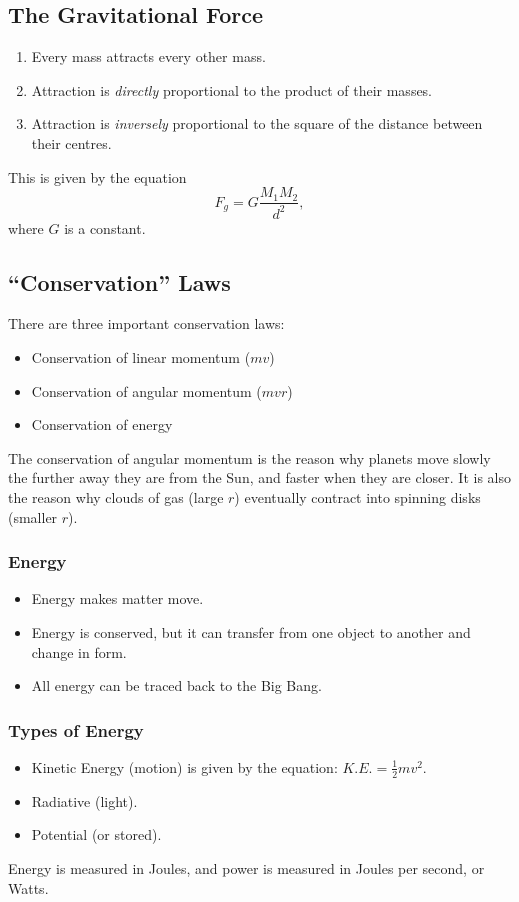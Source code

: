 \documentclass[class=article, crop=false]{standalone}
\begin{document}
  \subsection{The Gravitational Force}
  \begin{enumerate}
    \item Every mass attracts every other mass.
    \item Attraction is \emph{directly} proportional to the product of their masses.
    \item Attraction is \emph{inversely} proportional to the square of the distance between their centres.
  \end{enumerate}
  This is given by the equation
  \[
    F_g = G \frac{M_1M_2}{d^2},
  \]
  where $G$ is a constant.
  \subsection{``Conservation'' Laws}
  There are three important conservation laws:
  \begin{itemize}
    \item Conservation of linear momentum ($mv$)
    \item Conservation of angular momentum ($mvr$)
    \item Conservation of energy
  \end{itemize}
  The conservation of angular momentum is the reason why planets move slowly the further away they are from the Sun, and faster when they are closer. It is also the reason why clouds of gas (large $r$) eventually contract into spinning disks (smaller $r$).
  \subsubsection{Energy}
  \begin{itemize}
    \item Energy makes matter move.
    \item Energy is conserved, but it can transfer from one object to another and change in form.
    \item All energy can be traced back to the Big Bang.
  \end{itemize}
  \subsubsection{Types of Energy}
  \begin{itemize}
    \item Kinetic Energy (motion) is given by the equation: $K.E. = \frac{1}{2}mv^2$.
    \item Radiative (light).
    \item Potential (or stored).
  \end{itemize}
  Energy is measured in Joules, and power is measured in Joules per second, or Watts.
\end{document}
